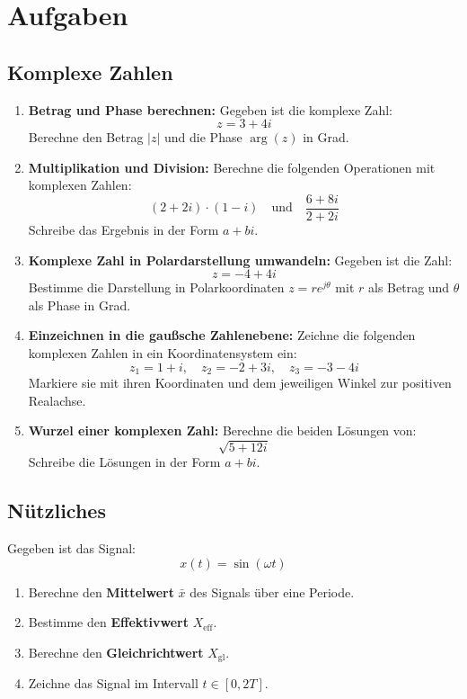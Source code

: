 \documentclass[11pt,a4paper]{article}
\begin{document}
\newpage
\section{Aufgaben}
\subsection{Komplexe Zahlen}
\begin{enumerate}
    \item \textbf{Betrag und Phase berechnen:}  
    Gegeben ist die komplexe Zahl:  
    \[
    z = 3 + 4i
    \]
    Berechne den Betrag \( |z| \) und die Phase \( \arg(z) \) in Grad.

    \item \textbf{Multiplikation und Division:}  
    Berechne die folgenden Operationen mit komplexen Zahlen:  
    \[
    (2 + 2i) \cdot (1 - i) \quad \text{und} \quad \frac{6 + 8i}{2 + 2i}
    \]
    Schreibe das Ergebnis in der Form \( a + bi \).

    \item \textbf{Komplexe Zahl in Polardarstellung umwandeln:}  
    Gegeben ist die Zahl:
    \[
    z = -4 + 4i
    \]
    Bestimme die Darstellung in Polarkoordinaten \( z = r e^{j\theta} \) mit \( r \) als Betrag und \( \theta \) als Phase in Grad.

    \item \textbf{Einzeichnen in die gaußsche Zahlenebene:}  
    Zeichne die folgenden komplexen Zahlen in ein Koordinatensystem ein:  
    \[
    z_1 = 1 + i, \quad z_2 = -2 + 3i, \quad z_3 = -3 - 4i
    \]
    Markiere sie mit ihren Koordinaten und dem jeweiligen Winkel zur positiven Realachse.

    \item \textbf{Wurzel einer komplexen Zahl:}  
    Berechne die beiden Lösungen von:
    \[
    \sqrt{5 + 12i}
    \]
    Schreibe die Lösungen in der Form \( a + bi \).
\end{enumerate}
\subsection{Nützliches}

Gegeben ist das Signal:
\[
x(t) = \sin(\omega t)
\]

\begin{enumerate}
    \item Berechne den \textbf{Mittelwert} \( \bar{x} \) des Signals über eine Periode.
    \item Bestimme den \textbf{Effektivwert} \( X_{\text{eff}} \).
    \item Berechne den \textbf{Gleichrichtwert} \( X_{\text{gl}} \).
    \item Zeichne das Signal im Intervall \( t \in [0, 2T] \).
\end{enumerate}
\end{document}
